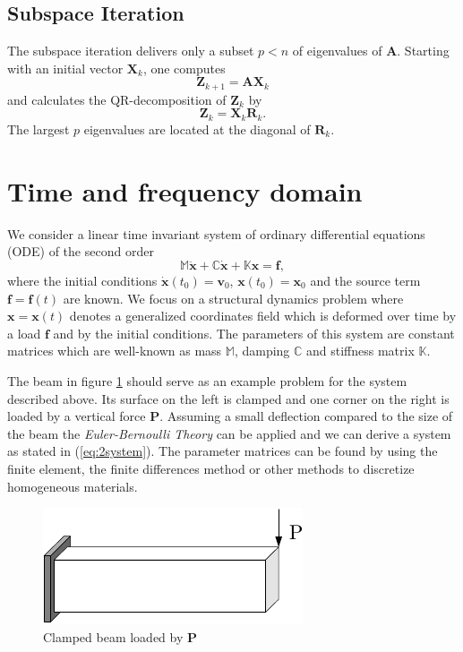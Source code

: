 \documentclass[conference]{journal}
\newcommand{\bb}[1]{\mathbb{#1}}
\newcommand{\B}[1]{\mathbf{#1}}
\newcommand{\Bx}{\B{x}}
\newcommand{\M}{\bb{M}}
\newcommand{\C}{\bb{C}}
\newcommand{\K}{\bb{K}}
\begin{document}
	\subsection*{Subspace Iteration}
	The subspace iteration delivers only a subset $p<n$ of eigenvalues of $\textbf{A}$. Starting with an initial vector $\textbf{X}_k$, one computes
	\begin{equation}
	\textbf{Z}_{k+1}=\textbf{AX}_k
	\end{equation}
	and calculates the QR-decomposition of $\textbf{Z}_k$ by
	\begin{equation}
	\textbf{Z}_k=\textbf{X}_k\textbf{R}_k.
	\end{equation}
	The largest $p$ eigenvalues are located at the diagonal of $\textbf{R}_k$.
	
	
	
	\section{Time and frequency domain}
	We consider a linear time invariant system of ordinary differential equations (ODE) of the second order
	\begin{equation} \label{eq:2system}
	\M \ddot{\Bx} + \C \dot{\Bx} + \K \Bx = \B{f},
	\end{equation}
	where the initial conditions $\dot{\Bx}(t_0)=\B{v}_0$, $\Bx(t_0)=\Bx_0$ and the source term $\B{f}=\B{f}(t)$ are known. We focus on a structural dynamics problem where $\Bx=\Bx(t)$ denotes a generalized coordinates field which is deformed over time by a load $\B{f}$ and by the initial conditions. The parameters of this system are constant matrices which are well-known as mass $\M$, damping $\C$ and stiffness matrix $\K$.

	The beam in figure \ref{fig:beam} should serve as an example problem for the system described above. Its surface on the left is clamped and one corner on the right is loaded by a vertical force $\B{P}$. Assuming a small deflection compared to the size of the beam the \textit{Euler-Bernoulli Theory} can be applied and we can derive a system as stated in (\ref{eq:2system}). The parameter matrices can be found by using the finite element, the finite differences method or other methods to discretize homogeneous materials.

	\begin{figure}[h]
	\centering
	\includegraphics{./figures/beam.pdf}
	\caption{Clamped beam loaded by $\B{P}$}
	\label{fig:beam}
	\end{figure}
\end{document}
